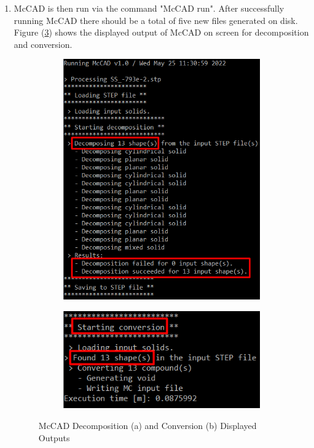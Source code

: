 \documentclass[letterpaper, 12 pt]{report}
\begin{document}
\begin{enumerate}
  \item McCAD is then run via the command "McCAD run". After successfully running McCAD there should be a total of five new files generated on disk. Figure (\ref{fig:McCAD Decomposition and Conversion Outputs}) shows the displayed output of McCAD on screen for decomposition and conversion.
  \begin{figure}[h]
  	\centering
  	\begin{subfigure}{.5\textwidth}
  		\centering
  		\includegraphics[width=.8\linewidth]{figures/McCAD_output_decomposition.png}
  		\caption{}
  		\label{fig:a}
  	\end{subfigure}%
  	\begin{subfigure}{.5\textwidth}
  		\centering
  		\includegraphics[width=.8\linewidth]{figures/McCAD_output_conversion.png}
  		\caption{}
  		\label{fig:b}
  	\end{subfigure}
  	\caption{McCAD Decomposition (a) and Conversion (b) Displayed Outputs}
  	\label{fig:McCAD Decomposition and Conversion Outputs}
  \end{figure}


\end{enumerate}
\end{document}
